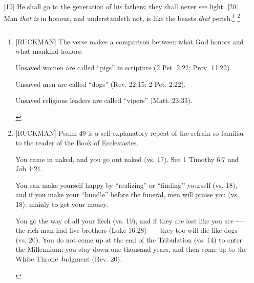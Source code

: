 [19] \textcolor[rgb]{0.00,0.00,1.00}{He shall go to the generation of his fathers; they shall never see light.}
[20] \textcolor[rgb]{0.00,0.00,1.00}{Man \emph{that} \emph{is} in honour, and understandeth not, is like the beasts \emph{that} perish.}\footnote{[RUCKMAN] The verse makes a comparison between what God honors and what mankind honors. \cite{Ruckman1992Psalms} \begin{compactenum}
    \item Unsaved women  are called “pigs” in scripture (2 Pet. 2:22; Prov. 11:22).
    \item Unsaved men are called “dogs” (Rev. 22:15; 2 Pet. 2:22).
    \item Unsaved religious leaders are called “vipers” (Matt. 23:33).
\end{compactenum}} \footnote{[RUCKMAN] Psalm 49 is a self-explanatory repeat of the refrain so familiar to the reader of the Book of Ecclesiastes. \cite{Ruckman1992Psalms}\begin{compactenum}
\item You came in naked, and you go out naked (vs. 17). See  1 Timothy 6:7 and Job 1:21.
\item You can make yourself happy by “realizing” or “finding’’ yourself (vs. 18), and if you make your “bundle” before the funeral, men will praise you (vs. 18): mainly to get your money.
\item You go the way of all your flesh (vs. 19), and if they are lost like you are -— the rich man had five brothers (Luke 16:28) -— they too will die like dogs (vs. 20). You do not come up at the end of the Tribulation (vs. 14) to enter the Millennium; you stay down one thousand years, and then come up to the White Throne Judgment (Rev. 20).
\end{compactenum} }

